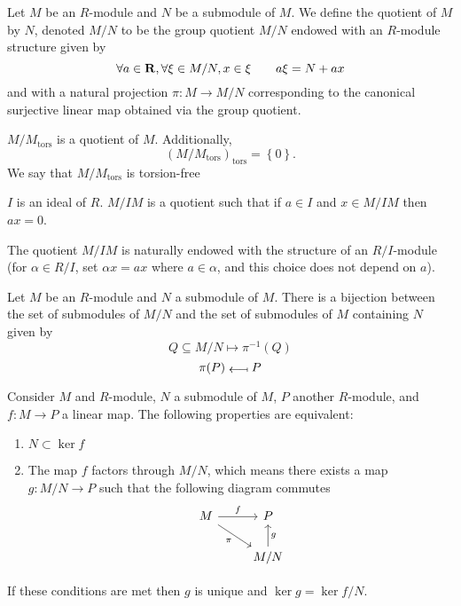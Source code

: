 \begin{dfn}
    Let $M$ be an $R$-module and $N$ be a submodule of $M$. We define the quotient of $M$ by $N$, denoted $M / N$ to be the group quotient $M / N$ endowed with an $R$-module structure given by \[\forall a\in \mathbf R, \forall \xi \in  M / N, x \in  \xi \qquad a\xi=N + ax \] and with a natural projection $\pi : M \longrightarrow  M / N$ corresponding to the canonical surjective linear map obtained via the group quotient.
\end{dfn}

\begin{ex}
    $ M / M_{\text{tors}}$ is a quotient of $M$. Additionally, \[(M / M_{\text{tors}})_{\text{tors}}=\left\{ 0 \right\}. \] We say that $ M / M_{\text{tors}}$ is torsion-free
\end{ex}

\begin{ex}
$I$ is an ideal of $R$. $M / IM$ is a quotient such that if $a \in  I$ and $x \in  M / IM$ then $ax=0$.

The quotient $M / IM$ is naturally endowed with the structure of an $ R / I$-module (for $\alpha \in  R / I$, set $\alpha x = ax$ where $a \in  \alpha$, and this choice does not depend on $a$).
\end{ex}

\begin{prop}
Let $M$ be an $R$-module and $N$ a submodule of $M$. There is a bijection between the set of submodules of  $M / N$ and the set of submodules of  $M$ containing  $N$ given by \[
Q \subseteq M / N \longmapsto \pi^{-1}(Q)
\] \[
\pi(P) \; \raisebox{\depth}{\rotatebox[origin=c]{180}{$\longmapsto$}}\; P
\] 
\end{prop}

\begin{thm}
Consider $M$ and $R$-module, $N$ a submodule of $M$,  $P$ another  $R$-module, and  $f : M \longrightarrow  P$ a linear map. The following properties are equivalent: \begin{enumerate}
    \item $N \subset \ker f$
    \item The map $f$ factors through $M / N$, which means there exists a map $g : M / N \longrightarrow  P$ such that the following diagram commutes \[\begin{tikzcd}
    M & P \\
    & {M/N}
    \arrow["f", from=1-1, to=1-2]
    \arrow["g"', from=2-2, to=1-2]
    \arrow["\pi"', from=1-1, to=2-2]
\end{tikzcd}\]
\end{enumerate}
If these conditions are met then $g$ is unique and $\ker g = \ker f / N$.
\end{thm}

